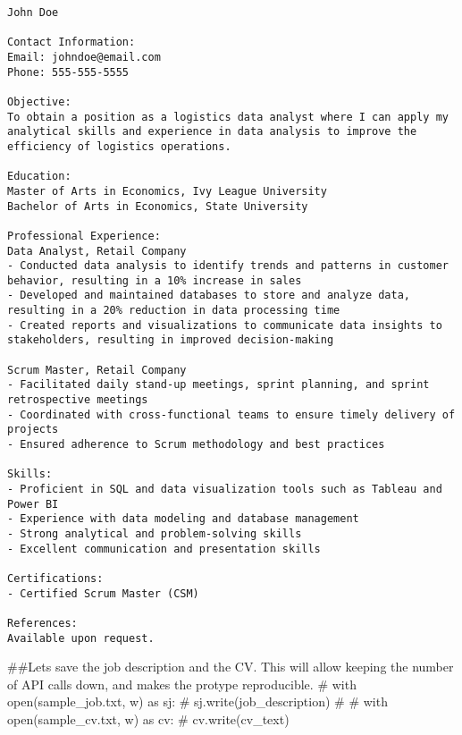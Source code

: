 \documentclass[
  letterpaper,
  DIV=11,
  numbers=noendperiod]{scrartcl}
\newenvironment{Shaded}{\begin{snugshade}}{\end{snugshade}}
\newcommand{\CommentTok}[1]{\textcolor[rgb]{0.37,0.37,0.37}{#1}}
\begin{document}
\begin{verbatim}
John Doe

Contact Information:
Email: johndoe@email.com
Phone: 555-555-5555

Objective:
To obtain a position as a logistics data analyst where I can apply my analytical skills and experience in data analysis to improve the efficiency of logistics operations.

Education:
Master of Arts in Economics, Ivy League University
Bachelor of Arts in Economics, State University

Professional Experience:
Data Analyst, Retail Company
- Conducted data analysis to identify trends and patterns in customer behavior, resulting in a 10% increase in sales
- Developed and maintained databases to store and analyze data, resulting in a 20% reduction in data processing time
- Created reports and visualizations to communicate data insights to stakeholders, resulting in improved decision-making

Scrum Master, Retail Company
- Facilitated daily stand-up meetings, sprint planning, and sprint retrospective meetings
- Coordinated with cross-functional teams to ensure timely delivery of projects
- Ensured adherence to Scrum methodology and best practices

Skills:
- Proficient in SQL and data visualization tools such as Tableau and Power BI
- Experience with data modeling and database management
- Strong analytical and problem-solving skills
- Excellent communication and presentation skills

Certifications:
- Certified Scrum Master (CSM)

References:
Available upon request.
\end{verbatim}

\begin{Shaded}
\begin{Highlighting}[]
\CommentTok{\#\#Lets save the job description and the CV. This will allow keeping the number of API calls down, and makes the protype reproducible.}
\CommentTok{\# with open(\textquotesingle{}sample\_job.txt\textquotesingle{}, \textquotesingle{}w\textquotesingle{}) as sj:}
\CommentTok{\#   sj.write(job\_description)}
\CommentTok{\# }
\CommentTok{\# with open(\textquotesingle{}sample\_cv.txt\textquotesingle{}, \textquotesingle{}w\textquotesingle{}) as cv:}
\CommentTok{\#   cv.write(cv\_text)}
\end{Highlighting}
\end{Shaded}
\end{document}
